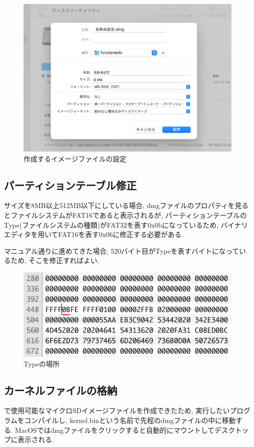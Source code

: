 \begin{figure}[H]
    \centering
    \includegraphics[width=13.5cm]{"figs/appA-diskutil.png"}
    \caption{作成するイメージファイルの設定} \label{fig:appA-diskutil}
\end{figure}

\subsection{パーティションテーブル修正}

サイズを8MB以上512MB以下にしている場合, dmgファイルのプロパティを見るとファイルシステムがFAT16であると表示されるが, パーティションテーブルのType(ファイルシステムの種類)がFAT32を表す0x0bになっているため, バイナリエディタを用いてFAT16を表す0x06に修正する必要がある. 

マニュアル通りに進めてきた場合, 520バイト目がTypeを表すバイトになっているため, そこを修正すればよい.

\begin{figure}[H]
    \centering
    \includegraphics[width=12cm]{"figs/appA-binaryEditor.png"}
    \caption{Typeの場所} \label{fig:appA-binedit}
\end{figure}

\subsection{カーネルファイルの格納}

\tacsim で使用可能なマイクロSDイメージファイルを作成できたため, 実行したいプログラムをコンパイルし, kernel.binという名前で先程のdmgファイルの中に移動する. MacOSではdmgファイルをクリックすると自動的にマウントしてデスクトップに表示される.
